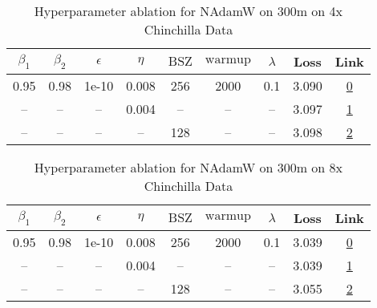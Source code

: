 \begin{table}[H]
\centering
\caption{Hyperparameter ablation for NAdamW on 300m on 4x Chinchilla Data}
\label{tab:ablation_nadamw_300m_4}
\begin{tabular}{ccccccccc}
\toprule
$\beta_1$ & $\beta_2$ & $\epsilon$ & $\eta$ & $\mathrm{BSZ}$ & $\mathrm{warmup}$ & $\lambda$ & Loss & Link \\
\midrule
0.95 & 0.98 & 1e-10 & 0.008 & 256 & 2000 & 0.1 & 3.090 & \href{https://wandb.ai/stanford-mercury/optimizer-scaling/runs/sweep-300m-24B-nadamwd89df2lr0.008-wd0.1-minlr0-warmup2000-b10.9-c667e7}{0} \\
\midrule
-- & -- & -- & 0.004 & -- & -- & -- & 3.097 & \href{https://wandb.ai/stanford-mercury/optimizer-scaling/runs/sweep-300m-24B-nadamw59ffb0lr0.004-wd0.1-minlr0-warmup2000-b10.9-53a554}{1} \\
-- & -- & -- & -- & 128 & -- & -- & 3.098 & \href{https://wandb.ai/stanford-mercury/optimizer-scaling/runs/sweep-300m-24B-nadamw506173lr0.008-wd0.1-minlr0-warmup2000-b10.9-aa9d7a}{2} \\
\bottomrule
\end{tabular}
\end{table}

\begin{table}[H]
\centering
\caption{Hyperparameter ablation for NAdamW on 300m on 8x Chinchilla Data}
\label{tab:ablation_nadamw_300m_8}
\begin{tabular}{ccccccccc}
\toprule
$\beta_1$ & $\beta_2$ & $\epsilon$ & $\eta$ & $\mathrm{BSZ}$ & $\mathrm{warmup}$ & $\lambda$ & Loss & Link \\
\midrule
0.95 & 0.98 & 1e-10 & 0.008 & 256 & 2000 & 0.1 & 3.039 & \href{https://wandb.ai/stanford-mercury/optimizer-scaling/runs/sweep-300m-48B-nadamw506173lr0.008-wd0.1-minlr0-warmup2000-b10.9-a344a3}{0} \\
\midrule
-- & -- & -- & 0.004 & -- & -- & -- & 3.039 & \href{https://wandb.ai/stanford-mercury/optimizer-scaling/runs/sweep-300m-48B-nadamw511d7blr0.004-wd0.1-minlr0-warmup2000-b10.9-9099f5}{1} \\
-- & -- & -- & -- & 128 & -- & -- & 3.055 & \href{https://wandb.ai/stanford-mercury/optimizer-scaling/runs/sweep-300m-48B-nadamwfd0717lr0.008-wd0.1-minlr0-warmup2000-b10.9-5665cf}{2} \\
\bottomrule
\end{tabular}
\end{table}

